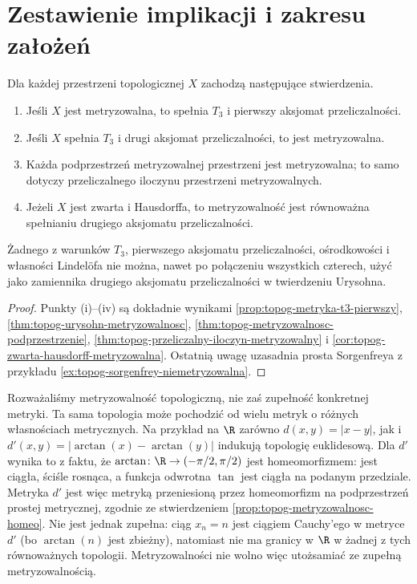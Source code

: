 \section{Zestawienie implikacji i zakresu założeń}
\label{sec:topog-metryzowalnosc-zestawienie}

\begin{stwierdzenie}
\label{prop:topog-metryzowalnosc-zestawienie}
Dla każdej przestrzeni topologicznej $X$ zachodzą następujące
stwierdzenia.
\begin{enumerate}[label=(\roman*)]
\item Jeśli $X$ jest metryzowalna, to spełnia $T_3$
i pierwszy aksjomat przeliczalności.
\item Jeśli $X$ spełnia $T_3$ i drugi aksjomat przeliczalności,
to jest metryzowalna.
\item Każda podprzestrzeń metryzowalnej przestrzeni
jest metryzowalna; to samo dotyczy przeliczalnego
iloczynu przestrzeni metryzowalnych.
\item Jeżeli $X$ jest zwarta i Hausdorffa, to
metryzowalność jest równoważna spełnianiu
drugiego aksjomatu przeliczalności.
\end{enumerate}
Żadnego z warunków $T_3$, pierwszego aksjomatu
przeliczalności, ośrodkowości i własności Lindelöfa
nie można, nawet po połączeniu wszystkich czterech,
użyć jako zamiennika drugiego aksjomatu przeliczalności
w twierdzeniu Urysohna.
\end{stwierdzenie}
\begin{proof}
Punkty (i)--(iv) są dokładnie wynikami
\ref{prop:topog-metryka-t3-pierwszy},
\ref{thm:topog-urysohn-metryzowalnosc},
\ref{thm:topog-metryzowalnosc-podprzestrzenie},
\ref{thm:topog-przeliczalny-iloczyn-metryzowalny}
i \ref{cor:topog-zwarta-hausdorff-metryzowalna}.
Ostatnią uwagę uzasadnia prosta Sorgenfreya z przykładu
\ref{ex:topog-sorgenfrey-niemetryzowalna}.
\end{proof}

\begin{uwaga}
Rozważaliśmy metryzowalność topologiczną,
nie zaś zupełność konkretnej metryki. Ta sama topologia
może pochodzić od wielu metryk o różnych własnościach
metrycznych. Na przykład na $\R$ zarówno
$d(x,y)=|x-y|$, jak i
$d'(x,y)=|\arctan(x)-\arctan(y)|$
indukują topologię euklidesową. Dla $d'$ wynika to
z faktu, że $\arctan\colon\R\to(-\pi/2,\pi/2)$
jest homeomorfizmem: jest ciągła, ściśle rosnąca,
a funkcja odwrotna $\tan$ jest ciągła na podanym
przedziale. Metryka $d'$ jest więc metryką przeniesioną
przez homeomorfizm na podprzestrzeń prostej metrycznej,
zgodnie ze stwierdzeniem
\ref{prop:topog-metryzowalnosc-homeo}.
Nie jest jednak zupełna: ciąg $x_n=n$ jest ciągiem
Cauchy'ego w metryce $d'$ (bo $\arctan(n)$ jest zbieżny),
natomiast nie ma granicy w $\R$ w żadnej z tych
równoważnych topologii. Metryzowalności nie wolno więc
utożsamiać ze zupełną metryzowalnością.
\end{uwaga}
